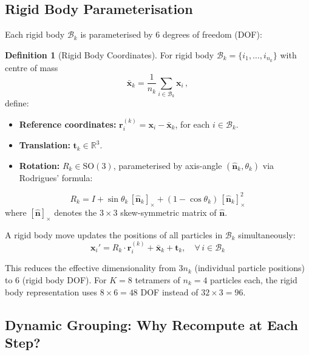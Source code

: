 \documentclass[11pt,a4paper]{article}
\newcommand{\bx}{\mathbf{x}}
\newcommand{\R}{\mathbb{R}}
\theoremstyle{definition}
\newtheorem{definition}{Definition}
\begin{document}
\subsection{Rigid Body Parameterisation}

Each rigid body $\mathcal{B}_k$ is parameterised by 6 degrees of freedom (DOF):

\begin{definition}[Rigid Body Coordinates]
For rigid body $\mathcal{B}_k = \{i_1, \ldots, i_{n_k}\}$ with centre of mass
\begin{equation}
    \bar{\bx}_k = \frac{1}{n_k} \sum_{i \in \mathcal{B}_k} \bx_i\,,
\end{equation}
define:
\begin{itemize}
    \item \textbf{Reference coordinates:} $\mathbf{r}_i^{(k)} = \bx_i - \bar{\bx}_k$, for each $i \in \mathcal{B}_k$.
    \item \textbf{Translation:} $\mathbf{t}_k \in \R^3$.
    \item \textbf{Rotation:} $R_k \in \mathrm{SO}(3)$, parameterised by axis-angle $(\hat{\mathbf{n}}_k, \theta_k)$ via Rodrigues' formula:
\end{itemize}
\begin{equation}
    R_k = I + \sin\theta_k\, [\hat{\mathbf{n}}_k]_\times + (1 - \cos\theta_k)\, [\hat{\mathbf{n}}_k]_\times^2
\end{equation}
where $[\hat{\mathbf{n}}]_\times$ denotes the $3 \times 3$ skew-symmetric matrix of $\hat{\mathbf{n}}$.
\end{definition}

A rigid body move updates the positions of all particles in $\mathcal{B}_k$ simultaneously:
\begin{equation}
    \bx_i' = R_k \cdot \mathbf{r}_i^{(k)} + \bar{\bx}_k + \mathbf{t}_k, \quad \forall\, i \in \mathcal{B}_k
    \label{eq:rigid_transform}
\end{equation}

This reduces the effective dimensionality from $3 n_k$ (individual particle positions) to $6$ (rigid body DOF). For $K = 8$ tetramers of $n_k = 4$ particles each, the rigid body representation uses $8 \times 6 = 48$ DOF instead of $32 \times 3 = 96$.

\subsection{Dynamic Grouping: Why Recompute at Each Step?}
\end{document}
